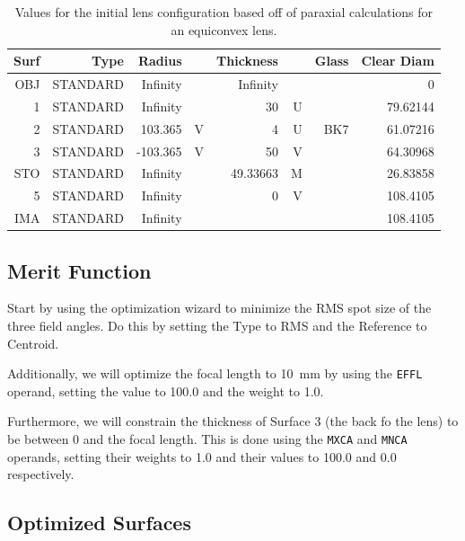 \documentclass[10pt,a4paper]{article}
\begin{document}
		\begin{table}[H]
			\centering
			\begin{tabular}{r| r r r r r r r }

				Surf &      	Type     &   	Radius&     &   	Thickness&      &     	Glass     & 	  Clear Diam \\ 				\hline
				OBJ&	 STANDARD	 &      Infinity&	&       Infinity&	    &&                 	             0\\
				1	& STANDARD	   &    Infinity&	  &           30&	 U       &&             	      79.62144\\ 
				2	& STANDARD	   &     103.365&	V  &            4&	 U       &          BK7&	      61.07216\\ 
				3&	 STANDARD	   &    -103.365&	V  &           50&	 V       &&             	      64.30968\\ 
				STO	& STANDARD	   &    Infinity&	  &     49.33663&	M        &&             	      26.83858 \\ 
				5&	 STANDARD	   &    Infinity&	  &            0& V	        &&             	      108.4105\\ 
				IMA	& STANDARD	    &   Infinity&	   &&&     &       	                     	      108.4105 \\ 
			\end{tabular}
			\caption{Values for the initial lens configuration based off of paraxial calculations for an equiconvex lens.}
			\label{init_v}
		\end{table}
	
	\subsection{Merit Function} \label{mf}
	
		Start by using the optimization wizard to minimize the RMS spot size of the three field angles. Do this by setting the Type to RMS and the Reference to Centroid.
		
		Additionally, we will optimize the focal length to \SI{10}{\milli \meter} by using the \texttt{EFFL} operand, setting the value to 100.0 and the weight to 1.0.
		
		Furthermore, we will constrain the thickness of Surface 3 (the back fo the lens) to be between 0 and the focal length. This is done using the \texttt{MXCA} and \texttt{MNCA} operands, setting their weights to 1.0 and their values to 100.0 and 0.0 respectively.
	
	\subsection{Optimized Surfaces}
	
\end{document}
